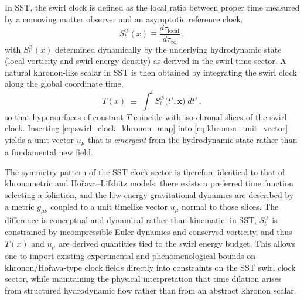 \documentclass[10pt,reprint,aps,onecolumn,nofootinbib]{revtex4-2}
\begin{document}
            In SST, the swirl clock is defined as the local ratio between proper time
            measured by a comoving matter observer and an asymptotic reference clock,
            \begin{equation}
                S_t^{\boldsymbol{\circlearrowleft}}(x)
                \equiv
                \frac{d\tau_{\text{local}}}{d\tau_\infty}
                \,,
                \label{eq:swirl_clock_def_kinematic}
            \end{equation}
            with \(S_t^{\boldsymbol{\circlearrowleft}}(x)\) determined dynamically by the
            underlying hydrodynamic state (local vorticity and swirl energy density) as
            derived in the swirl-time sector. A natural khronon-like scalar in SST is then
            obtained by integrating the swirl clock along the global coordinate time,
            \begin{equation}
                T(x)
                \;\equiv\;
                \int^{t}
                S_t^{\boldsymbol{\circlearrowleft}}\!\bigl(t',\mathbf{x}\bigr)\; dt' \,,
                \label{eq:swirl_clock_khronon_map}
            \end{equation}
            so that hypersurfaces of constant \(T\) coincide with iso-chronal slices of
            the swirl clock. Inserting \eqref{eq:swirl_clock_khronon_map} into
            \eqref{eq:khronon_unit_vector} yields a unit vector \(u_\mu\) that is
            \emph{emergent} from the hydrodynamic state rather than a fundamental new
            field.

            The symmetry pattern of the SST clock sector is therefore identical to that
            of khronometric and Hořava--Lifshitz models: there exists a preferred time
            function selecting a foliation, and the low-energy gravitational dynamics
            are described by a metric \(g_{\mu\nu}\) coupled to a unit timelike vector
            \(u_\mu\) normal to those slices. The difference is conceptual and
            dynamical rather than kinematic: in SST, \(S_t^{\boldsymbol{\circlearrowleft}}\)
            is constrained by incompressible Euler dynamics and conserved vorticity,
            and thus \(T(x)\) and \(u_\mu\) are derived quantities tied to the swirl
            energy budget. This allows one to import existing experimental and
            phenomenological bounds on khronon/Hořava-type clock fields directly into
            constraints on the SST swirl clock sector, while maintaining the physical
            interpretation that time dilation arises from structured hydrodynamic flow
            rather than from an abstract khronon scalar.
\end{document}
